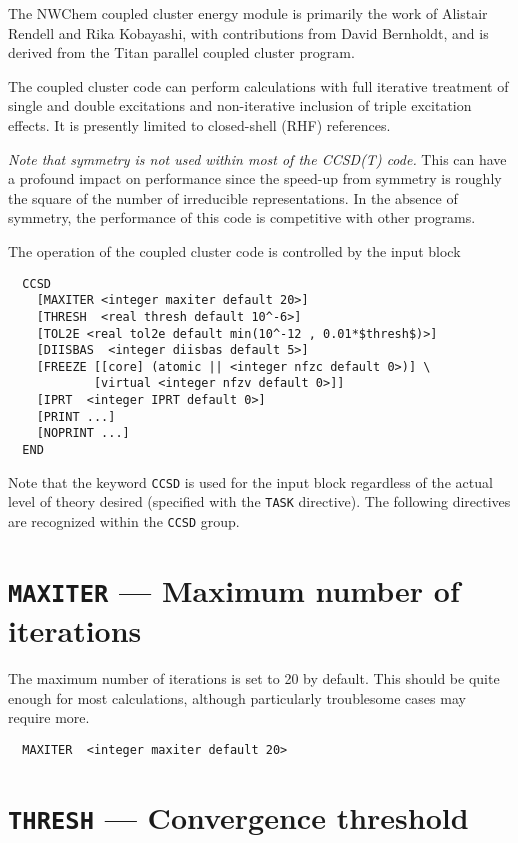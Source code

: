 \label{sec:ccsd}

The NWChem coupled cluster energy module is primarily the work of
Alistair Rendell and Rika Kobayashi, with contributions from David
Bernholdt, and is derived from the Titan parallel coupled cluster
program.

The coupled cluster code can perform calculations with full iterative
treatment of single and double excitations and non-iterative inclusion
of triple excitation effects.  It is presently limited to closed-shell
(RHF) references.

{\em Note that symmetry is not used within most of the CCSD(T) code.}
This can have a profound impact on performance since the speed-up from
symmetry is roughly the square of the number of irreducible
representations.  In the absence of symmetry, the performance of this
code is competitive with other programs.

The operation of the coupled cluster code is controlled by the input
block
\begin{verbatim}
  CCSD
    [MAXITER <integer maxiter default 20>]
    [THRESH  <real thresh default 10^-6>]
    [TOL2E <real tol2e default min(10^-12 , 0.01*$thresh$)>]
    [DIISBAS  <integer diisbas default 5>]
    [FREEZE [[core] (atomic || <integer nfzc default 0>)] \
            [virtual <integer nfzv default 0>]]
    [IPRT  <integer IPRT default 0>]
    [PRINT ...]
    [NOPRINT ...]
  END
\end{verbatim}
Note that the keyword \verb+CCSD+ is used for the input block
regardless of the actual level of theory desired (specified with the
\verb+TASK+ directive).  The following directives are recognized
within the \verb+CCSD+ group.

\section{{\tt MAXITER} --- Maximum number of iterations}

The maximum number of iterations is set to 20 by default.  This should
be quite enough for most calculations, although particularly
troublesome cases may require more.

\begin{verbatim}
  MAXITER  <integer maxiter default 20>
\end{verbatim}

\section{{\tt THRESH} --- Convergence threshold}

